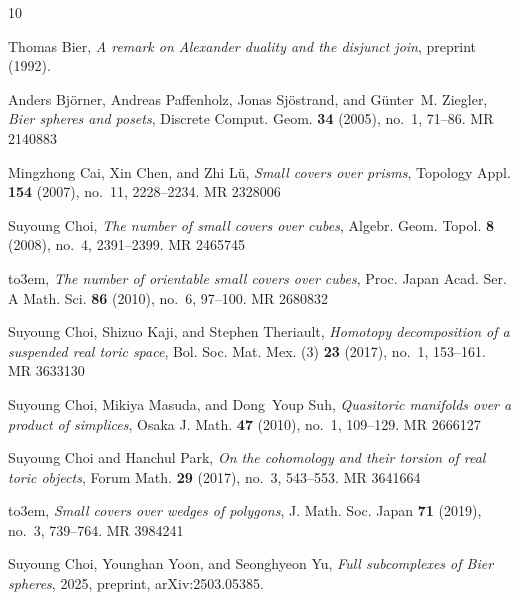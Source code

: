 \documentclass[11pt]{amsart}
\theoremstyle{plain}
\numberwithin{equation}{section}
\theoremstyle{definition}
\begin{document}
\providecommand{\bysame}{\leavevmode\hbox to3em{\hrulefill}\thinspace}
\providecommand{\MR}{\relax\ifhmode\unskip\space\fi MR }
\providecommand{\MRhref}[2]{%
  \href{http://www.ams.org/mathscinet-getitem?mr=#1}{#2}
}
\providecommand{\href}[2]{#2}
\begin{thebibliography}{10}

Thomas Bier, \emph{A remark on {A}lexander duality and the disjunct join},
  preprint (1992).

Anders Bj\"orner, Andreas Paffenholz, Jonas Sj\"ostrand, and G\"unter~M.
  Ziegler, \emph{Bier spheres and posets}, Discrete Comput. Geom. \textbf{34}
  (2005), no.~1, 71--86. \MR{2140883}

Mingzhong Cai, Xin Chen, and Zhi L{\"u}, \emph{Small covers over prisms},
  Topology Appl. \textbf{154} (2007), no.~11, 2228--2234. \MR{2328006}

Suyoung Choi, \emph{The number of small covers over cubes}, Algebr. Geom.
  Topol. \textbf{8} (2008), no.~4, 2391--2399. \MR{2465745}

\bysame, \emph{The number of orientable small covers over cubes}, Proc. Japan
  Acad. Ser. A Math. Sci. \textbf{86} (2010), no.~6, 97--100. \MR{2680832}

Suyoung Choi, Shizuo Kaji, and Stephen Theriault, \emph{Homotopy decomposition
  of a suspended real toric space}, Bol. Soc. Mat. Mex. (3) \textbf{23} (2017),
  no.~1, 153--161. \MR{3633130}

Suyoung Choi, Mikiya Masuda, and Dong~Youp Suh, \emph{Quasitoric manifolds over
  a product of simplices}, Osaka J. Math. \textbf{47} (2010), no.~1, 109--129.
  \MR{2666127}

Suyoung Choi and Hanchul Park, \emph{On the cohomology and their torsion of
  real toric objects}, Forum Math. \textbf{29} (2017), no.~3, 543--553.
  \MR{3641664}

\bysame, \emph{Small covers over wedges of polygons}, J. Math. Soc. Japan
  \textbf{71} (2019), no.~3, 739--764. \MR{3984241}

Suyoung Choi, Younghan Yoon, and Seonghyeon Yu, \emph{Full subcomplexes of
  {B}ier spheres}, 2025, preprint, arXiv:2503.05385.


\end{thebibliography}
\end{document}
